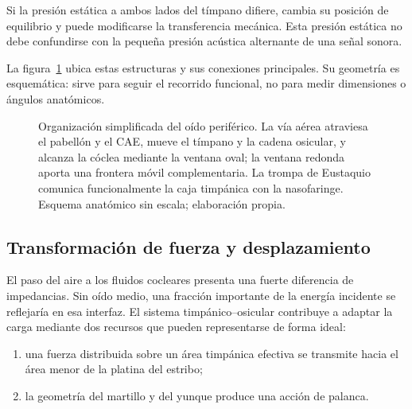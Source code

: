 
 Si la presión estática a ambos
lados del tímpano difiere, cambia su posición de equilibrio y puede
modificarse la transferencia mecánica. Esta presión estática no debe
confundirse con la pequeña presión acústica alternante de una señal sonora.

La figura~\ref{fig:u6-organizacion-oido-periferico} ubica estas estructuras y
sus conexiones principales. Su geometría es esquemática: sirve para seguir el
recorrido funcional, no para medir dimensiones o ángulos anatómicos.

\begin{figure}[htbp]
    \centering
    
    \caption{Organización simplificada del oído periférico. La vía aérea
    atraviesa el pabellón y el CAE, mueve el tímpano y la cadena osicular, y
    alcanza la cóclea mediante la ventana oval; la ventana redonda aporta una
    frontera móvil complementaria. La trompa de Eustaquio comunica
    funcionalmente la caja timpánica con la nasofaringe. Esquema anatómico sin
    escala; elaboración propia.}
    \label{fig:u6-organizacion-oido-periferico}
\end{figure}

\subsection{Transformación de fuerza y desplazamiento}
\label{sec:u6-transformacion-oido-medio}

El paso del aire a los fluidos cocleares presenta una fuerte diferencia de
impedancias. Sin oído medio, una fracción importante de la energía incidente
se reflejaría en esa interfaz. El sistema timpánico--osicular contribuye a
adaptar la carga mediante dos recursos que pueden representarse de forma
ideal:

\begin{enumerate}
    \item una fuerza distribuida sobre un área timpánica efectiva se transmite
    hacia el área menor de la platina del estribo;
    \item la geometría del martillo y del yunque produce una acción de
    palanca.
\end{enumerate}

